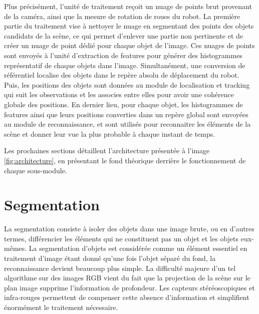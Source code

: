 Plus précisément, l'unité de traitement reçoit un nuage de points brut provenant de la caméra, ainsi que la mesure de rotation de roues du robot. La première partie du traitement vise à nettoyer le nuage en segmentant des points des objets candidats de la scène, ce qui permet d'enlever une partie non pertinente et de créer un nuage de point dédié pour chaque objet de l'image. Ces nuages de points sont envoyés à l'unité d'extraction de features pour générer des histogrammes représentatif de chaque objets dans l'image. Simultanément, une conversion de référentiel localise des objets dans le repère absolu de déplacement du robot. Puis, les positions des objets sont données au module de localisation et tracking qui suit les observations et les associes entre elles pour avoir une cohérence globale des positions. En dernier lieu, pour chaque objet, les histogrammes de features ainsi que leurs positions converties dans un repère global sont envoyées au module de reconnaissance, et sont utilisés pour reconnaitre les éléments de la scène et donner leur vue la plus probable à chaque instant de temps. 

Les prochaines sections détaillent l'architecture présentée à l'image \ref{fig:architecture}, en présentant le fond théorique derrière le fonctionnement de chaque sous-module.

\section{Segmentation}

La segmentation consiste à isoler des objets dans une image brute, ou en d'autres termes, différencier les éléments qui ne constituent pas un objet et les objets eux-mêmes. La segmentation d'objets est considérée comme un élément essentiel en traitement d'image étant donné qu'une fois l'objet séparé du fond, la reconnaissance devient beaucoup plus simple. La difficulté majeure d'un tel algorithme sur des images RGB vient du fait que la projection de la scène sur le plan image supprime l'information de profondeur. Les capteurs stéréoscopiques et infra-rouges permettent de compenser cette absence d'information et simplifient énormément le traitement nécessaire.

